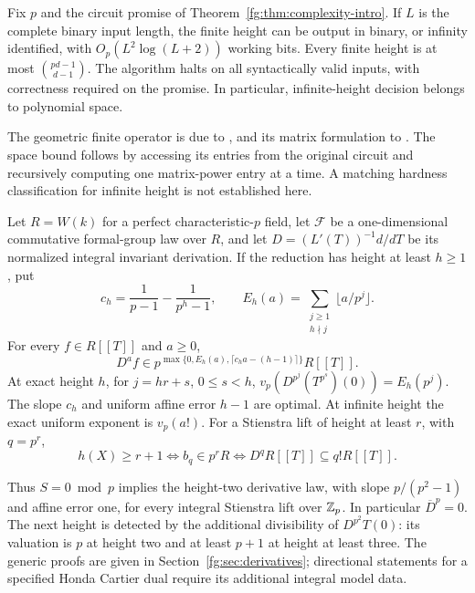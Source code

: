 \begin{theorem}\label{fg:thm:space-intro}
Fix $p$ and the circuit promise of Theorem~\ref{fg:thm:complexity-intro}.
If $L$ is the complete binary input length, the finite height can be
output in binary, or infinity identified, with
$O_p(L^2\log(L+2))$ working bits. Every finite height is at most
$\binom{pd-1}{d-1}$. The algorithm halts on all syntactically valid
inputs, with correctness required on the promise. In particular,
infinite-height decision belongs to polynomial space.
\end{theorem}

The geometric finite operator is due to
\citet[Theorem~C]{fg-kty-one}, and its matrix formulation to
\citet[\S3.4]{fg-bgp}. The space bound follows by accessing its entries
from the original circuit and recursively computing one matrix-power
entry at a time. A matching hardness classification for infinite height
is not established here.

\begin{theorem}\label{fg:thm:derivative-intro}
Let $R=W(k)$ for a perfect characteristic-$p$ field, let $\mathcal F$ be
a one-dimensional commutative formal-group law over $R$, and let
$D=(L'(T))^{-1}d/dT$ be its normalized integral invariant derivation.
If the reduction has height at least $h\ge1$, put
\[
 c_h=\frac1{p-1}-\frac1{p^h-1},\qquad
 E_h(a)=\sum_{\substack{j\ge1\\h\nmid j}}\lfloor a/p^j\rfloor.
\]
For every $f\in R[[T]]$ and $a\ge0$,
\[
 D^af\in p^{\max\{0,E_h(a),\lceil c_ha-(h-1)\rceil\}}R[[T]].
\]
At exact height $h$, for $j=hr+s$, $0\le s<h$,
$v_p(D^{p^j}(T^{p^s})(0))=E_h(p^j)$. The slope $c_h$ and uniform
affine error $h-1$ are optimal. At infinite height the exact uniform
exponent is $v_p(a!)$.
For a Stienstra lift of height at least $r$, with $q=p^r$,
\[
 h(X)\ge r+1\iff b_q\in p^rR
      \iff D^qR[[T]]\subseteq q!R[[T]].
\]
\end{theorem}

Thus $S=0\bmod p$ implies the height-two derivative law, with slope
$p/(p^2-1)$ and affine error one, for every integral Stienstra lift over
$\mathbb Z_p$. In particular $\overline D^{p}=0$. The next height is detected
by the additional divisibility of $D^{p^2}T(0)$: its valuation is $p$
at height two and at least $p+1$ at height at least three. The generic
proofs are given in Section~\ref{fg:sec:derivatives}; directional
statements for a specified Honda Cartier dual require its additional
integral model data.

